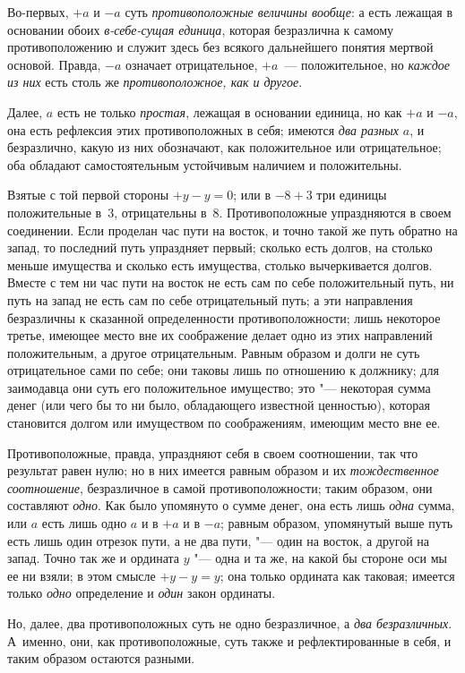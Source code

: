 Во-первых, $+a$ и $-a$ суть {\em противоположные величины вообще}:
$а$ есть лежащая в основании обоих
{\em в-себе-сущая единица}, которая безразлична к
самому противоположению и служит здесь без всякого дальнейшего понятия
мертвой основой. Правда, $-a$ означает
отрицательное, $+a$~--- положительное, но
{\em каждое из них} есть столь же {\em противоположное, как и другое}.

Далее, $a$ есть не только {\em простая}, лежащая в основании единица, но как
$+a$ и $-a$, она есть рефлексия этих противоположных в себя; имеются {\em два
разных} $a$, и безразлично, какую из них обозначают, как положительное или
отрицательное; оба обладают самостоятельным устойчивым наличием и положительны.

Взятые с той первой стороны $+y-y=0$; или в $-8+3$ три единицы положительные
в~3, отрицательны в~8. Противоположные упраздняются в своем соединении. Если
проделан час пути на восток, и точно такой же путь обратно на запад, то
последний путь упраздняет первый; сколько есть долгов, на столько меньше
имущества и сколько есть имущества, столько вычеркивается долгов. Вместе с
тем ни час пути на восток не есть сам по себе положительный путь, ни путь
на запад не есть сам по себе отрицательный путь; а эти направления
безразличны к сказанной определенности противоположности; лишь некоторое
третье, имеющее место вне их соображение делает одно из этих направлений
положительным, а другое отрицательным. Равным образом и долги не суть
отрицательное сами по себе; они таковы лишь по отношению к должнику; для
заимодавца они суть его положительное имущество; это "--- некоторая сумма
денег (или чего бы то ни было, обладающего известной ценностью), которая
становится долгом или имуществом по соображениям, имеющим место вне ее.

Противоположные, правда, упраздняют себя в своем соотношении, так что
результат равен нулю; но в них имеется равным образом и их
{\em тождественное соотношение}, безразличное в самой
противоположности; таким образом, они составляют
{\em одно}. Как было упомянуто о сумме денег, она есть
лишь {\em одна} сумма, или $a$ есть лишь одно $a$ и в $+a$ и в $-a$; равным
образом, упомянутый выше путь есть лишь один отрезок пути, а не два
пути, "--- один на восток, а другой на запад. Точно так же и ордината
$y$ "--- одна и та же, на какой бы стороне оси мы ее ни
взяли; в этом смысле $+y-y=y$; она только ордината как таковая;
имеется только {\em одно} определение и {\em один} закон ординаты.

Но, далее, два противоположных суть не одно безразличное, а
{\em два безразличных}. А~именно, они, как противоположные, суть также
и рефлектированные в себя, и таким образом остаются разными.

